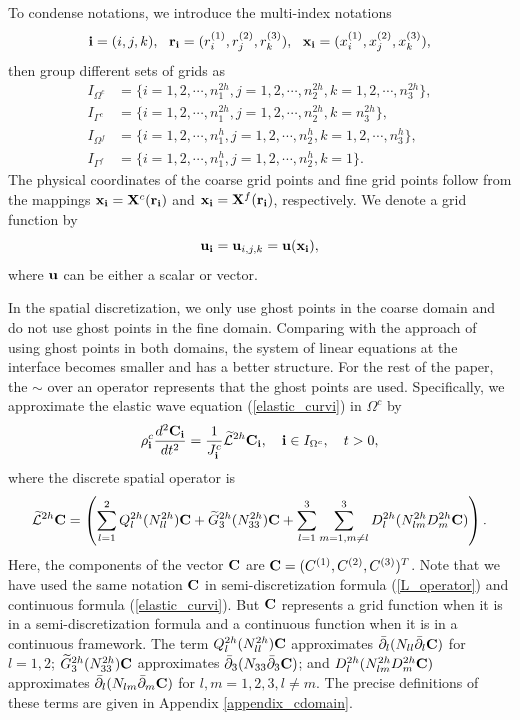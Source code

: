  To condense notations, we introduce the multi-index notations
\[{\bf i} = (i,j,k),\ \ {\bf r}_{\bf i} = (r^{(1)}_i,r^{(2)}_j,r^{(3)}_k),\ \ {\bf x}_{\bf i} = (x^{(1)}_i,x^{(2)}_j,x^{(3)}_k),\]
then group different sets of grids as
\begin{equation*}
\begin{aligned}
	I_{\Omega^c} &= \{i = 1,2,\cdots,n_1^{2h}, j = 1,2,\cdots,n_2^{2h}, k = 1,2,\cdots,n_3^{2h}\},\\
	I_{\Gamma^c} & = \{i = 1,2,\cdots,n_1^{2h}, j = 1,2,\cdots,n_2^{2h}, k = n_3^{2h}\},\\
	I_{\Omega^f} &= \{i = 1,2,\cdots,n_1^h, j = 1,2,\cdots,n_2^h, k = 1,2,\cdots,n_3^h\},\\
	I_{\Gamma^f} & = \{i = 1,2,\cdots,n_1^{h}, j = 1,2,\cdots,n_2^{h}, k = 1\}.
\end{aligned}	
\end{equation*}
The physical coordinates of the coarse grid points and fine grid points follow from the mappings ${\bf x}_{\bf i} = {\bf X}^c({\bf r}_{\bf i})$ and ${\bf x}_{\bf i} = {\bf X}^f({\bf r}_{\bf i})$, respectively. We denote a grid function by
\[{\bf u}_{\bf i} = {\bf u}_{i,j,k} = {\bf u}({\bf x}_{\bf i}),\]
where ${\bf u}$ can be either a scalar or vector. 

In the spatial discretization, we only use ghost points in the coarse domain and do not use ghost points in the fine domain. Comparing with the approach of using ghost points in both domains, the system of linear equations at the interface becomes smaller and has a better structure. For the rest of the paper, the $\sim$ over an operator represents that the ghost points are used. Specifically, we approximate the elastic wave equation (\ref{elastic_curvi}) in $\Omega^c$ by
\begin{equation}\label{elastic_semi_c}
{\rho}_{\bf i}^{c}\frac{d^2{{\bf C}_{\bf i}}}{dt^2} = \frac{1}{J^c_{\bf i}}\wt{\mathcal{L}}^{2h} {{\bf C}}_{\bf i},\quad {\bf i}\in I_{\Omega^c},\quad t>0,
\end{equation}
where the discrete spatial operator is
\begin{equation}\label{L_operator}
\wt{\mathcal{L}}^{2h} {{\bf C}} = \left(\sum_{l=1}^2{Q}_l^{2h}({N}_{ll}^{2h}){\bf C}+\wt{{G}}_3^{2h}({N}_{33}^{2h}){{\bf C}}+\sum_{l=1}^3\sum_{m=1,m\neq l}^3{D}_l^{2h}({N}_{lm}^{2h}{D}_m^{2h}{\bf C})\right).
\end{equation}
Here, the components of the vector ${\bf C}$ are ${\bf C} = (C^{(1)}, C^{(2)}, C^{(3)})^T$. Note that we have used the same notation ${\bf C}$ in semi-discretization formula (\ref{L_operator}) and continuous formula (\ref{elastic_curvi}). But ${\bf C}$ represents a grid function when it is in a semi-discretization formula and a continuous function when it is in a continuous framework. The term $Q_l^{2h}(N_{ll}^{2h}){\bf C}$ approximates $\bar{\partial}_l(N_{ll}\bar{\partial}_l{\bf C})$ for $ l = 1,2$; $\widetilde{G}_3^{2h}(N_{33}^{2h}){\bf C}$ approximates $\bar{\partial}_3(N_{33}\bar{\partial}_3 {\bf C})$; and $D_{l}^{2h}(N_{lm}^{2h}D_m^{2h}{\bf C})$ approximates $\bar{\partial}_l(N_{lm}\bar{\partial}_m {\bf C})$ for  $l,m = 1,2,3, l\neq m$. The precise definitions of these terms are given in  Appendix \ref{appendix_cdomain}.

